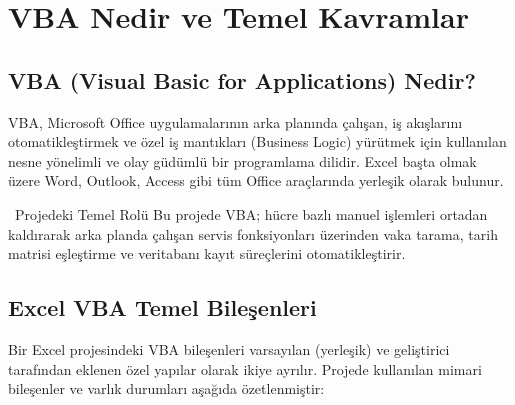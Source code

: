 \chapter{VBA Nedir ve Temel Kavramlar}



\section{VBA (Visual Basic for Applications) Nedir?}

VBA, Microsoft Office uygulamalarının arka planında çalışan, iş akışlarını otomatikleştirmek ve özel iş mantıkları (Business Logic) yürütmek için kullanılan nesne yönelimli ve olay güdümlü bir programlama dilidir. Excel başta olmak üzere Word, Outlook, Access gibi tüm Office araçlarında yerleşik olarak bulunur.

\begin{infobox}{\faTerminal\ Projedeki Temel Rolü}
Bu projede VBA; hücre bazlı manuel işlemleri ortadan kaldırarak arka planda çalışan servis fonksiyonları üzerinden vaka tarama, tarih matrisi eşleştirme ve veritabanı kayıt süreçlerini otomatikleştirir.
\end{infobox}

\vspace{0.1cm}

\section{Excel VBA Temel Bileşenleri}

Bir Excel projesindeki VBA bileşenleri varsayılan (yerleşik) ve geliştirici tarafından eklenen özel yapılar olarak ikiye ayrılır. Projede kullanılan mimari bileşenler ve varlık durumları aşağıda özetlenmiştir:

